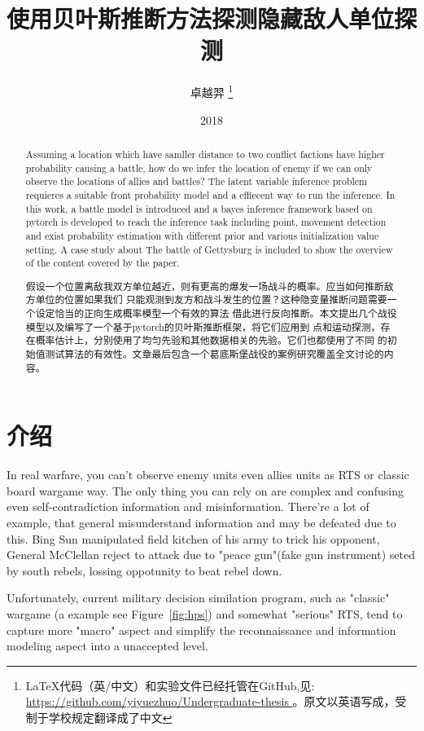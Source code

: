 \documentclass{article}
\title{使用贝叶斯推断方法探测隐藏敌人单位探测}
\author{卓越羿 
\footnote{LaTeX代码（英/中文）和实验文件已经托管在GitHub,见: 
\url{ https://github.com/yiyuezhuo/Undergraduate-thesis } 。原文以英语写成，受制于学校规定翻译成了中文}
}
\date{2018}
\begin{document}
\maketitle

\begin{abstract}

Assuming a location which have samller distance to two conflict factions have higher probability causing a battle,
how do we infer the location of enemy if we can only observe the locations of allies and battles? 
The latent variable inference problem requieres a suitable front probability model and a effiecent way to run the 
inference. In this work, a battle model is introduced and a bayes inference framework based on pytorch 
is developed to reach the inference task including point, movement detection and 
exist probability estimation with different prior and various initialization value setting.
A case study about The battle of Gettysburg is included to show the overview of the content covered by the paper.

假设一个位置离敌我双方单位越近，则有更高的爆发一场战斗的概率。应当如何推断敌方单位的位置如果我们
只能观测到友方和战斗发生的位置？这种隐变量推断问题需要一个设定恰当的正向生成概率模型一个有效的算法
借此进行反向推断。本文提出几个战役模型以及编写了一个基于pytorch的贝叶斯推断框架，将它们应用到
点和运动探测，存在概率估计上，分别使用了均匀先验和其他数据相关的先验。它们也都使用了不同
的初始值测试算法的有效性。文章最后包含一个葛底斯堡战役的案例研究覆盖全文讨论的内容。

\end{abstract}

\tableofcontents



\section{介绍}

In real warfare, you can't observe enemy units even allies units as RTS or classic board wargame way.
The only thing you can rely on are complex and confusing even self-contradiction information and misinformation.
There're a lot of example, that general misunderstand information and may be defeated due to this. 
Bing Sun manipulated field kitchen of his army to trick his opponent, General McClellan reject to attack
due to "peace gun"(fake gun instrument) seted by south rebels, lossing oppotunity to beat rebel down.

Unfortunately, current military decision similation program, 
such as "classic" wargame (a example see Figure~\ref{fig:hps}) and somewhat  "serious" RTS, 
tend to capture more "macro" aspect and simplify the reconnaissance and 
information modeling aspect into a unaccepted level.
\end{document}
